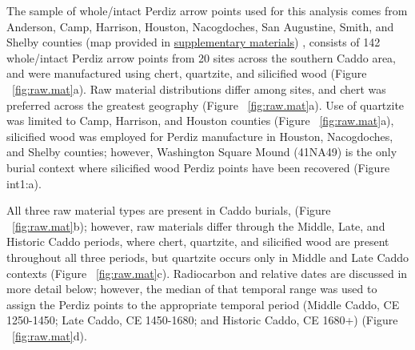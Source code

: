 \documentclass[review]{elsarticle}
\begin{document}
The sample of whole/intact Perdiz arrow points used for this analysis comes from Anderson, Camp, Harrison, Houston, Nacogdoches, San Augustine, Smith, and Shelby counties (map provided in \href{https://aksel-blaise.github.io/perdiz/spatial.html}{supplementary materials}) \citep{RN8980}, consists of 142 whole/intact Perdiz arrow points from 20 sites across the southern Caddo area, and were manufactured using chert, quartzite, and silicified wood (Figure ~\ref{fig:raw.mat}a). Raw material distributions differ among sites, and chert was preferred across the greatest geography (Figure ~\ref{fig:raw.mat}a). Use of quartzite was limited to Camp, Harrison, and Houston counties (Figure ~\ref{fig:raw.mat}a), silicified wood was employed for Perdiz manufacture in Houston, Nacogdoches, and Shelby counties; however, Washington Square Mound (41NA49) is the only burial context where silicified wood Perdiz points have been recovered (Figure int1:a).

All three raw material types are present in Caddo burials, (Figure ~\ref{fig:raw.mat}b); however, raw materials differ through the Middle, Late, and Historic Caddo periods, where chert, quartzite, and silicified wood are present throughout all three periods, but quartzite occurs only in Middle and Late Caddo contexts (Figure ~\ref{fig:raw.mat}c). Radiocarbon and relative dates are discussed in more detail below; however, the median of that temporal range was used to assign the Perdiz points to the appropriate temporal period (Middle Caddo, CE 1250-1450; Late Caddo, CE 1450-1680; and Historic Caddo, CE 1680+) (Figure ~\ref{fig:raw.mat}d).
\end{document}
